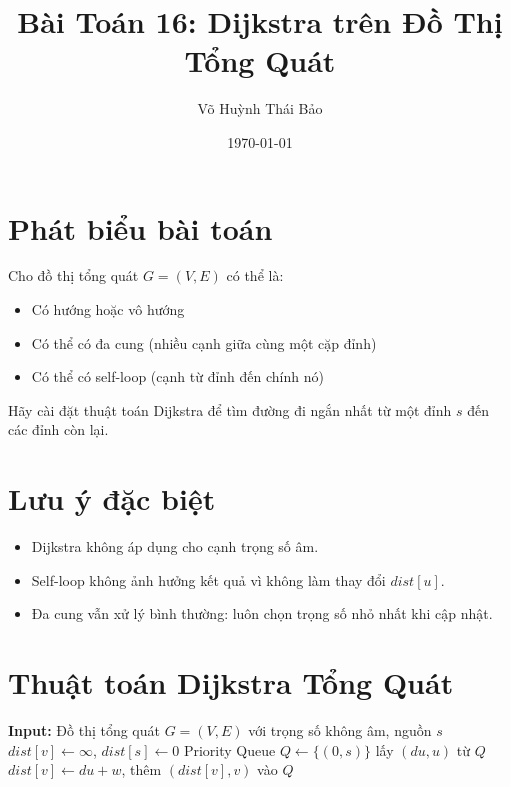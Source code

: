 \documentclass[12pt,a4paper]{article}
\title{Bài Toán 16: Dijkstra trên Đồ Thị Tổng Quát}
\author{Võ Huỳnh Thái Bảo}
\date{\today}
\begin{document}
\maketitle

\section*{Phát biểu bài toán}
Cho đồ thị tổng quát $G = (V, E)$ có thể là:
\begin{itemize}
  \item Có hướng hoặc vô hướng
  \item Có thể có đa cung (nhiều cạnh giữa cùng một cặp đỉnh)
  \item Có thể có self-loop (cạnh từ đỉnh đến chính nó)
\end{itemize}

Hãy cài đặt thuật toán Dijkstra để tìm đường đi ngắn nhất từ một đỉnh $s$ đến các đỉnh còn lại.

\section*{Lưu ý đặc biệt}
\begin{itemize}
  \item Dijkstra không áp dụng cho cạnh trọng số âm.
  \item Self-loop không ảnh hưởng kết quả vì không làm thay đổi $dist[u]$.
  \item Đa cung vẫn xử lý bình thường: luôn chọn trọng số nhỏ nhất khi cập nhật.
\end{itemize}

\section*{Thuật toán Dijkstra Tổng Quát}
\begin{algorithmic}
\State \textbf{Input:} Đồ thị tổng quát $G = (V, E)$ với trọng số không âm, nguồn $s$
\State $dist[v] \gets \infty$, $dist[s] \gets 0$
\State Priority Queue $Q \gets \{(0, s)\}$
  \State lấy $(du, u)$ từ $Q$
      \State $dist[v] \gets du + w$, thêm $(dist[v], v)$ vào $Q$
    \EndIf
  \EndFor
\EndWhile
\end{algorithmic}
\end{document}
